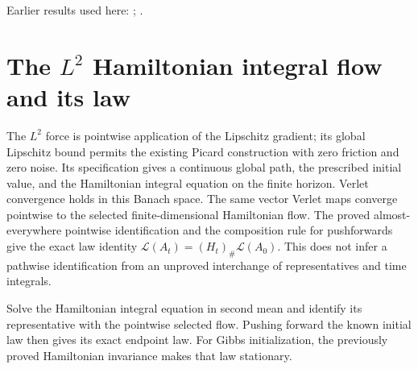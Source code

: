 \documentclass[11pt,a4paper]{article}
\begin{document}
Earlier results used here: \cite[Section~3.13.2]{LangevinLean2026ULASC}; \cite[Section~3.13.5]{LangevinLean2026ULASC}.

\section{\texorpdfstring{The \(L^{2}\) Hamiltonian integral flow and its law}{The L² Hamiltonian integral flow and its law}}


The \(L^{2}\) force is pointwise application of the Lipschitz gradient; its global Lipschitz bound permits the existing Picard construction with zero friction and zero noise. Its specification gives a continuous global path, the prescribed initial value, and the Hamiltonian integral equation on the finite horizon. Verlet convergence holds in this Banach space. The same vector Verlet maps converge pointwise to the selected finite-dimensional Hamiltonian flow. The proved almost-everywhere pointwise identification and the composition rule for pushforwards give the exact law identity \(\mathcal L(A_t)=(H_t)_\#\mathcal L(A_0)\). This does not infer a pathwise identification from an unproved interchange of representatives and time integrals.



Solve the Hamiltonian integral equation in second mean and identify its representative with the pointwise selected flow. Pushing forward the known initial law then gives its exact endpoint law. For Gibbs initialization, the previously proved Hamiltonian invariance makes that law stationary.
\end{document}
